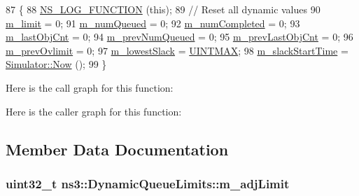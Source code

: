 \begin{DoxyCode}
87 \{
88   \hyperlink{log-macros-disabled_8h_a90b90d5bad1f39cb1b64923ea94c0761}{NS\_LOG\_FUNCTION} (\textcolor{keyword}{this});
89   \textcolor{comment}{// Reset all dynamic values}
90   \hyperlink{classns3_1_1DynamicQueueLimits_ace85f564a3f7b4aadfed9dc7df775579}{m\_limit} = 0;
91   \hyperlink{classns3_1_1DynamicQueueLimits_a5ac74a84c50fccf99c9580d21554146b}{m\_numQueued} = 0;
92   \hyperlink{classns3_1_1DynamicQueueLimits_a324eecdc6e60e01387b707d64caa117c}{m\_numCompleted} = 0;
93   \hyperlink{classns3_1_1DynamicQueueLimits_a9c73bed5ccb64c8c93ebb8ba3579f6a5}{m\_lastObjCnt} = 0;
94   \hyperlink{classns3_1_1DynamicQueueLimits_a88d80e7cd24b67993d9416ff0c7fd75d}{m\_prevNumQueued} = 0;
95   \hyperlink{classns3_1_1DynamicQueueLimits_aa0575ebe24da604189c82e32df9882e3}{m\_prevLastObjCnt} = 0;
96   \hyperlink{classns3_1_1DynamicQueueLimits_a63d5c451bd659754d9968445e5c3a1b9}{m\_prevOvlimit} = 0;
97   \hyperlink{classns3_1_1DynamicQueueLimits_ab47105c4df36adf2512a8fbc3fd4da4d}{m\_lowestSlack} = \hyperlink{dynamic-queue-limits_8cc_a3f63b751e6af68c85a8282699067ba2f}{UINTMAX};
98   \hyperlink{classns3_1_1DynamicQueueLimits_a4e63a333752db6ccdaa6c232c4f5433b}{m\_slackStartTime} = \hyperlink{classns3_1_1Simulator_ac3178fa975b419f7875e7105be122800}{Simulator::Now} ();
99 \}
\end{DoxyCode}


Here is the call graph for this function\+:




Here is the caller graph for this function\+:




\subsection{Member Data Documentation}
\subsubsection[{\texorpdfstring{m\+\_\+adj\+Limit}{m_adjLimit}}]{\setlength{\rightskip}{0pt plus 5cm}uint32\+\_\+t ns3\+::\+Dynamic\+Queue\+Limits\+::m\+\_\+adj\+Limit\hspace{0.3cm}{\ttfamily [private]}}\hypertarget{classns3_1_1DynamicQueueLimits_a01bb59a1f0048f3b0206d86f1c0ca0ba}{}\label{classns3_1_1DynamicQueueLimits_a01bb59a1f0048f3b0206d86f1c0ca0ba}



